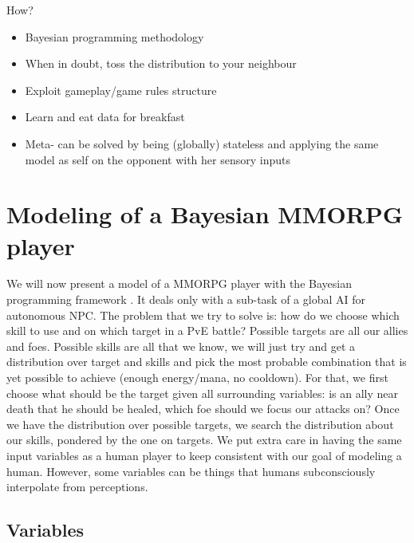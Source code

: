 How?
\begin{itemize}
\item Bayesian programming methodology
\item When in doubt, toss the distribution to your neighbour
\item Exploit gameplay/game rules structure
\item Learn and eat data for breakfast
\item Meta- can be solved by being (globally) stateless and applying the same model as self on the opponent with her sensory inputs
\end{itemize}

\section{Modeling of a Bayesian MMORPG player}

We will now present a model of a MMORPG player with the Bayesian programming framework \citep{SYNNAEVE:MMORPG}. It deals only with a sub-task of a global AI for autonomous NPC. The problem that we try to solve is: how do we choose which skill to use and on which target in a PvE battle? Possible targets are all our allies and foes. Possible skills are all that we know, we will just try and get a distribution over target and skills and pick the most probable combination that is yet possible to achieve (enough energy/mana, no cooldown). For that, we first choose what should be the target given all surrounding variables: is an ally near death that he should be healed, which foe should we focus our attacks on? Once we have the distribution over possible targets, we search the distribution about our skills, pondered by the one on targets. We put extra care in having the same input variables as a human player to keep consistent with our goal of modeling a human. However, some variables can be things that humans subconsciously interpolate from perceptions.

\subsection{Variables}

